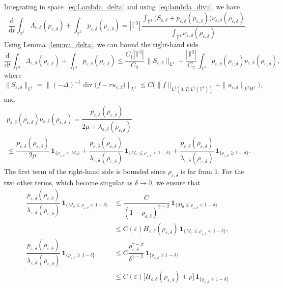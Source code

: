 \documentclass[JEP,XML,SOM,Unicode,NoEqCountersInSection]{cedram}
\newcommand{\<}{\bigl\langle}
\renewcommand{\>}{\bigr\rangle}
\newcommand{\labeleq}[1]{}
\theoremstyle{definition}
\theoremstyle{remark}
\newcommand{\TT}{\mathbb{T}^3}
\DeclareMathOperator{\Div}{div}
\newcommand{\Dt}{\dfrac{\mathrm{d}}{\mathrm{d} t}}
\let\ep\varepsilon
\begin{document}
Integrating in space~\eqref{eq:Lambda_delta} and using~\eqref{eq:lambda_divu}, we have
\begin{equation*}
\Dt \int_{\TT}{\Lambda_{\ep,\delta}(\rho_{\ep,\delta})} + \int_{\TT}{p_{\ep,\delta}(\rho_{\ep,\delta})}
= |\TT|\,\dfrac{\int_{\TT}{\big(S_{\ep,\delta}+p_{\ep,\delta}(\rho_{\ep,\delta})\big)\nu_{\ep,\delta}(\rho_{\ep,\delta})}}{\int_{\TT}{\nu_{\ep,\delta}(\rho_{\ep,\delta})}}.
\end{equation*}
Using Lemma~\ref{lem:nu_delta}, we can bound the right-hand side
\begin{equation}\label{eq:dt-Lambda-delta}
\Dt \int_{\TT}{\Lambda_{\ep,\delta}(\rho_{\ep,\delta})} + \int_{\TT}{p_{\ep,\delta}(\rho_{\ep,\delta})}
\leq \dfrac{C_1|\TT|}{C_2}\,\|S_{\ep,\delta}\|_{L^1} + \dfrac{|\TT|}{C_2}\int_{\TT}{p_{\ep,\delta}(\rho_{\ep,\delta})\nu_{\ep,\delta}(\rho_{\ep,\delta})},
\end{equation}
where
\[
\|S_{\ep,\delta}\|_{L^1} = \|(-\Delta)^{-1}\Div \big(f-r u_{\ep,\delta}\big) \|_{L^1}
\leq C \big(\|f\|_{L^2(0,T; L^{\bar{q}}(\TT))} + \|u_{\ep,\delta}\|_{L^2H^1}\big),
\]
and
\begin{multline*}
p_{\ep,\delta}(\rho_{\ep,\delta})\nu_{\ep,\delta}(\rho_{\ep,\delta})
= \dfrac{p_{\ep,\delta}(\rho_{\ep,\delta})}{2\mu + \lambda_{\ep,\delta}(\rho_{\ep,\delta})} \\
\leq \dfrac{p_{\ep,\delta}(\rho_{\ep,\delta})}{2\mu}\,\mathbf{1}_{\{\rho_{\ep,\delta} < M_0 \}}
+ \dfrac{p_{\ep,\delta}(\rho_{\ep,\delta})}{\lambda_{\ep,\delta}(\rho_{\ep,\delta})}\,\mathbf{1}_{\{M_0 \leq \rho_{\ep,\delta} < 1-\delta \}}
+ \dfrac{p_{\ep,\delta}(\rho_{\ep,\delta})}{\lambda_{\ep,\delta}(\rho_{\ep,\delta})}\,\mathbf{1}_{\{\rho_{\ep,\delta} \geq 1-\delta \}}.
\end{multline*}
The first term of the right-hand side is bounded since $\rho_{\ep,\delta}$
is far from $1$.
For the two other terms, which become singular as $\delta \rightarrow 0$, we ensure that
\begin{align*}
\dfrac{p_{\ep,\delta}(\rho_{\ep,\delta})}{\lambda_{\ep,\delta}(\rho_{\ep,\delta})}\,\mathbf{1}_{\{M_0 \leq \rho_{\ep,\delta} < 1-\delta \}}
& \leq \dfrac{C}{(1-\rho_{\ep,\delta})^{\gamma-\beta}}\,\mathbf{1}_{\{M_0 \leq \rho_{\ep,\delta} < 1-\delta \}}\\
& \leq C(\ep)H_{\ep,\delta}(\rho_{\ep,\delta})\,\mathbf{1}_{\{M_0 \leq \rho_{\ep,\delta} < 1-\delta \}} \labeleq{estim-p-v0},\\
\dfrac{p_{\ep,\delta}(\rho_{\ep,\delta})}{\lambda_{\ep,\delta}(\rho_{\ep,\delta})}\,\mathbf{1}_{\{\rho_{\ep,\delta} \geq 1-\delta \}}
& \leq C \dfrac{\rho_{\ep,\delta}^{\gamma-\beta}}{\delta^{\gamma-\beta}}\,\mathbf{1}_{\{\rho_{\ep,\delta} \geq 1-\delta \}} \\
& \leq C(\ep)\bigl[H_{\ep,\delta}(\rho_{\ep,\delta})
+ \rho\bigr]\,\mathbf{1}_{\{\rho_{\ep,\delta} \geq 1-\delta \}}
\end{align*}
\end{document}
